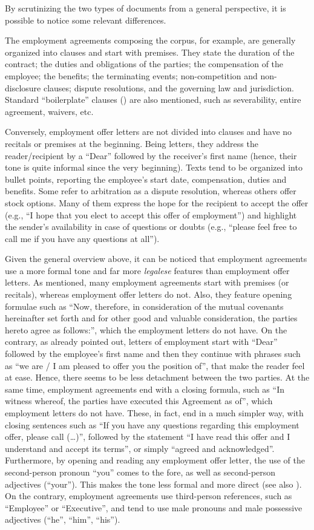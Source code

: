 \documentclass[output=paper]{langscibook}
\begin{document}
By scrutinizing the two types of documents from a general perspective, it is possible to notice some relevant differences.

The employment agreements composing the corpus, for example, are generally organized into clauses and start with premises. They state the duration of the contract; the duties and obligations of the parties; the compensation of the employee; the benefits; the terminating events; non-competition and non-disclosure clauses; dispute resolutions, and the governing law and jurisdiction. Standard “boilerplate” clauses (\citealt{Cordero-Moss2011}) are also mentioned, such as severability, entire agreement, waivers, etc.

Conversely, employment offer letters are not divided into clauses and have no recitals or premises at the beginning. Being letters, they address the reader/recipient by a “Dear” followed by the receiver’s first name (hence, their tone is quite informal since the very beginning). Texts tend to be organized into bullet points, reporting the employee’s start date, compensation, duties and benefits. Some refer to arbitration as a dispute resolution, whereas others offer stock options. Many of them express the hope for the recipient to accept the offer (e.g., “I hope that you elect to accept this offer of employment”) and highlight the sender’s availability in case of questions or doubts (e.g., “please feel free to call me if you have any questions at all”).

Given the general overview above, it can be noticed that employment agreements use a more formal tone and far more \textit{legalese} features than employment offer letters. As mentioned, many employment agreements start with premises (or recitals), whereas employment offer letters do not. Also, they feature opening formulae such as “Now, therefore, in consideration of the mutual covenants hereinafter set forth and for other good and valuable consideration, the parties hereto agree as follows:”, which the employment letters do not have. On the contrary, as already pointed out, letters of employment start with “Dear” followed by the employee’s first name and then they continue with phrases such as “we are / I am pleased to offer you the position of”, that make the reader feel at ease. Hence, there seems to be less detachment between the two parties. At the same time, employment agreements end with a closing formula, such as “In witness whereof, the parties have executed this Agreement as of”, which employment letters do not have. These, in fact, end in a much simpler way, with closing sentences such as “If you have any questions regarding this employment offer, please call (…)”, followed by the statement “I have read this offer and I understand and accept its terms”, or simply “agreed and acknowledged”. Furthermore, by opening and reading any employment offer letter, the use of the second-person pronoun “you” comes to the fore, as well as second-person adjectives (“your”). This makes the tone less formal and more direct (see also \citealt{Williams2023}). On the contrary, employment agreements use third-person references, such as “Employee” or “Executive”, and tend to use male pronouns and male possessive adjectives (“he”, “him”, “his”).
\end{document}
